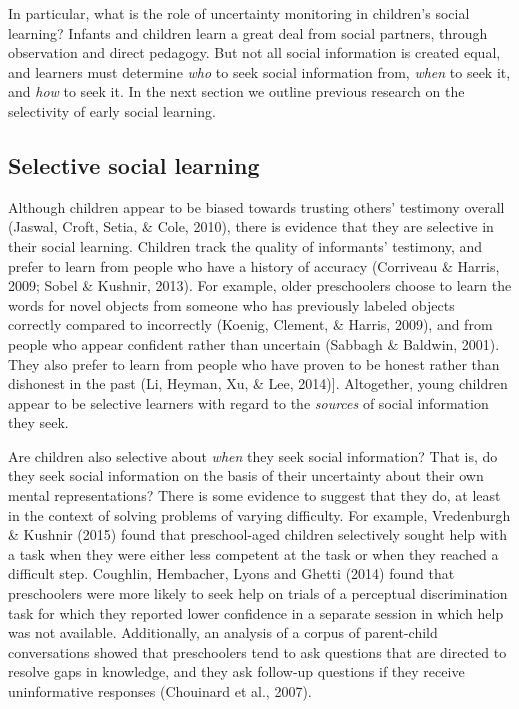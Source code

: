 \documentclass[a4paper,man,apacite,floatsintext]{apa6}
\begin{document}
In particular, what is the role of uncertainty monitoring in children's
social learning? Infants and children learn a great deal from social
partners, through observation and direct pedagogy. But not all social
information is created equal, and learners must determine \emph{who} to
seek social information from, \emph{when} to seek it, and \emph{how} to
seek it. In the next section we outline previous research on the
selectivity of early social learning.

\subsection{Selective social learning}\label{selective-social-learning}

Although children appear to be biased towards trusting others' testimony
overall (Jaswal, Croft, Setia, \& Cole, 2010), there is evidence that
they are selective in their social learning. Children track the quality
of informants' testimony, and prefer to learn from people who have a
history of accuracy (Corriveau \& Harris, 2009; Sobel \& Kushnir, 2013).
For example, older preschoolers choose to learn the words for novel
objects from someone who has previously labeled objects correctly
compared to incorrectly (Koenig, Clement, \& Harris, 2009), and from
people who appear confident rather than uncertain (Sabbagh \& Baldwin,
2001). They also prefer to learn from people who have proven to be
honest rather than dishonest in the past (Li, Heyman, Xu, \& Lee,
2014){]}. Altogether, young children appear to be selective learners
with regard to the \emph{sources} of social information they seek.

Are children also selective about \emph{when} they seek social
information? That is, do they seek social information on the basis of
their uncertainty about their own mental representations? There is some
evidence to suggest that they do, at least in the context of solving
problems of varying difficulty. For example, Vredenburgh \& Kushnir
(2015) found that preschool-aged children selectively sought help with a
task when they were either less competent at the task or when they
reached a difficult step. Coughlin, Hembacher, Lyons and Ghetti (2014)
found that preschoolers were more likely to seek help on trials of a
perceptual discrimination task for which they reported lower confidence
in a separate session in which help was not available. Additionally, an
analysis of a corpus of parent-child conversations showed that
preschoolers tend to ask questions that are directed to resolve gaps in
knowledge, and they ask follow-up questions if they receive
uninformative responses (Chouinard et al., 2007).
\end{document}
